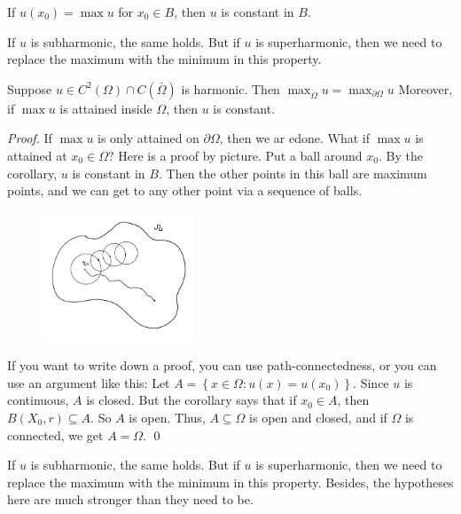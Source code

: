 \begin{corollary}
    If $u(x_0)= \max u$ for $x_0\in B$, then $u$ is constant in $B$.
\end{corollary}
\begin{remark}
    If $u$ is subharmonic, the same holds. But if $u$ is superharmonic, then we need to replace the maximum with the minimum in this property.
\end{remark}


\begin{theorem}
    Suppose $u \in C^{2}(\Omega) \cap C(\bar{\Omega})$ is harmonic. Then $\max _{\bar{\Omega}} u=\max _{\partial \Omega} u$
Moreover, if $\max u$ is attained inside $\Omega$, then $u$ is constant.
\end{theorem}

\begin{proof}
    If $\max u$ is only attained on $\partial \Omega$, then we ar edone. What if $\max u$ is attained at $x_{0} \in \Omega ?$ Here is a proof by picture. Put a ball around $x_{0} .$ By the corollary, $u$ is constant in $B$. Then the other points in this ball are maximum points, and we can get to any other point via a sequence of balls.

    \begin{figure}[H]
        \centering
        \includegraphics[width=0.4\textwidth]{Pics/22-2.png}
    \end{figure}
    If you want to write down a proof, you can use path-connectedness, or you can use an argument like this: Let $A=\left\{x \in \Omega: u(x)=u\left(x_{0}\right)\right\} .$ Since $u$ is continuous, $A$ is closed. But the corollary says that if $x_{0} \in A$, then $B\left(X_{0}, r\right) \subseteq A .$ So $A$ is open. Thus, $A \subseteq \Omega$ is open and closed, and if $\Omega$ is connected, we get $A=\Omega$.
    \qed 
\end{proof}
\begin{remark}
    If $u$ is subharmonic, the same holds. But if $u$ is superharmonic, then we need to replace the maximum with the minimum in this property. Besides, the hypotheses here are much stronger than they need to be.
\end{remark}

